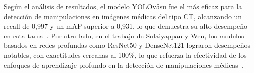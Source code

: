 \documentclass[conference]{IEEEtran}
\begin{document}
Según el análisis de resultados, el modelo YOLOv5su fue el más eficaz para la detección de manipulaciones en imágenes médicas del tipo CT, alcanzando un recall de 0,997 y un mAP superior a 0,931, lo que demuestra su alto desempeño en esta tarea~\cite{yetis2024}. Por otro lado, en el trabajo de Solaiyappan y Wen, los modelos basados en redes profundas como ResNet50 y DenseNet121 lograron desempeños notables, con exactitudes cercanas al 100\%, lo que refuerza la efectividad de los enfoques de aprendizaje profundo en la detección de manipulaciones médicas~\cite{solaiyappan2022}.




\end{document}
